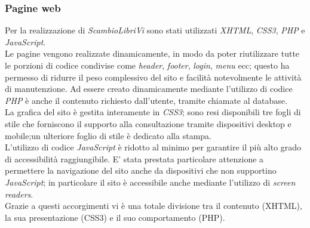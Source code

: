 \documentclass[openany,10pt,a4paper]{article}
\begin{document}
		\subsubsection{Pagine web}
			Per la realizzazione di  \textit{ScambioLibriVi} sono stati utilizzati \textit{XHTML}, \textit{CSS3}, \textit{PHP} e \textit{JavaScript}. \\
			Le pagine vengono realizzate dinamicamente, in modo da poter riutilizzare tutte le porzioni di codice condivise come \textit{header}, \textit{footer}, \textit{login}, \textit{menu} ecc; questo ha permesso di ridurre il peso complessivo del sito e facilità notevolmente le attività di manutenzione. Ad essere creato dinamicamente mediante l'utilizzo di codice \textit{PHP} è anche il contenuto richiesto dall'utente, tramite chiamate al database.
			\\ La grafica del sito è gestita interamente in \textit{CSS3}; sono resi disponibili tre fogli di stile che forniscono il supporto alla consultazione tramite dispositivi desktop e mobile;un ulteriore foglio di stile è dedicato alla stampa. 
			\\ L'utilizzo di codice \textit{JavaScript} è ridotto al minimo per garantire il più alto grado di accessibilità raggiungibile. E' stata prestata particolare attenzione a permettere la navigazione del sito anche da dispositivi che non supportino \textit{JavaScript}; in particolare il sito è accessibile anche mediante l'utilizzo di \textit{screen readers}.
			\\ Grazie a questi accorgimenti vi è una totale divisione tra il contenuto (XHTML), la sua presentazione (CSS3) e il suo comportamento (PHP).
			
\end{document}
